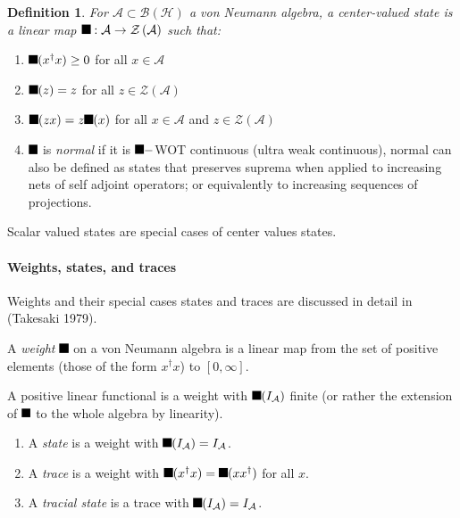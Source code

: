 \documentclass[aps,preprint]{revtex4}%
\providecommand{\U}[1]{\protect\rule{.1in}{.1in}}
\newtheorem{definition}[theorem]{Definition}
\begin{document}
\begin{definition}
For $\mathcal{A}\subset\mathcal{B(H)}$ a von Neumann algebra, a
\emph{center-valued state} is a linear map $\U{3d5} :\mathcal{A\rightarrow
Z}\left(  \mathcal{A}\right)  $ such that:
\end{definition}

\begin{enumerate}
\item $\U{3d5} (x^{\dagger}x)\geq0$ for all $x\in\mathcal{A}$

\item $\U{3d5} (z)=z$ for all $z\in\mathcal{Z}\left(  \mathcal{A}\right)  $

\item $\U{3d5} (zx)=z\U{3d5} (x)$ for all $x\in\mathcal{A}$ and $z\in
\mathcal{Z}\left(  \mathcal{A}\right)  $

\item $\U{3d5} $ is \emph{normal} if it is $\U{3c3} -$WOT continuous (ultra
weak continuous), normal can also be defined as states that preserves suprema
when applied to increasing nets of self adjoint operators; or equivalently to
increasing sequences of projections.
\end{enumerate}

Scalar valued states are special cases of center values states.

\paragraph{Weights, states, and traces}

Weights and their special cases states and traces are discussed in detail in
(Takesaki 1979).

A \emph{weight} $\U{3c9} $ on a von Neumann algebra is a linear map from the
set of positive elements (those of the form $x^{\dagger}x$) to $[0,\infty]$.

A positive linear functional is a weight with $\U{3c9} (I_{\mathcal{A}})$
finite (or rather the extension of $\U{3c9} $ to the whole algebra by linearity).

\begin{enumerate}
\item A \emph{state} is a weight with $\U{3c9} (I_{\mathcal{A}}%
)=I_{\mathcal{A}}$.

\item A \emph{trace} is a weight with $\U{3c9} (x^{\dagger}x)=\U{3c9}
(xx^{\dagger})$ for all $x$.

\item A \emph{tracial state} is a trace with $\U{3c9} (I_{\mathcal{A}%
})=I_{\mathcal{A}}$.
\end{enumerate}
\end{document}
